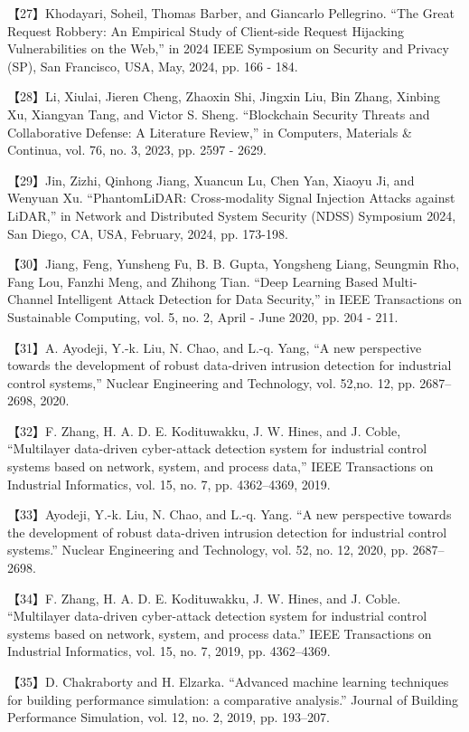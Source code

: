 【27】Khodayari, Soheil, Thomas Barber, and Giancarlo Pellegrino. “The Great Request Robbery: An Empirical Study of Client-side Request Hijacking Vulnerabilities on the Web,” in 2024 IEEE Symposium on Security and Privacy (SP), San Francisco, USA, May, 2024, pp. 166 - 184.

【28】Li, Xiulai, Jieren Cheng, Zhaoxin Shi, Jingxin Liu, Bin Zhang, Xinbing Xu, Xiangyan Tang, and Victor S. Sheng. “Blockchain Security Threats and Collaborative Defense: A Literature Review,” in Computers, Materials \& Continua, vol. 76, no. 3, 2023, pp. 2597 - 2629.

【29】Jin, Zizhi, Qinhong Jiang, Xuancun Lu, Chen Yan, Xiaoyu Ji, and Wenyuan Xu. “PhantomLiDAR: Cross-modality Signal Injection Attacks against LiDAR,” in Network and Distributed System Security (NDSS) Symposium 2024, San Diego, CA, USA, February, 2024, pp. 173-198.

【30】Jiang, Feng, Yunsheng Fu, B. B. Gupta, Yongsheng Liang, Seungmin Rho, Fang Lou, Fanzhi Meng, and Zhihong Tian. “Deep Learning Based Multi-Channel Intelligent Attack Detection for Data Security,” in IEEE Transactions on Sustainable Computing, vol. 5, no. 2, April - June 2020, pp. 204 - 211.

【31】A. Ayodeji, Y.-k. Liu, N. Chao, and L.-q. Yang, “A new perspective towards the development of robust data-driven intrusion detection for industrial control systems,” Nuclear Engineering and Technology, vol. 52,no. 12, pp. 2687–2698, 2020.

【32】F. Zhang, H. A. D. E. Kodituwakku, J. W. Hines, and J. Coble, “Multilayer data-driven cyber-attack detection system for industrial control systems based on network, system, and process data,” IEEE Transactions on Industrial Informatics, vol. 15, no. 7, pp. 4362–4369, 2019.

【33】Ayodeji, Y.-k. Liu, N. Chao, and L.-q. Yang. “A new perspective towards the development of robust data-driven intrusion detection for industrial control systems.” Nuclear Engineering and Technology, vol. 52, no. 12, 2020, pp. 2687–2698.

【34】F. Zhang, H. A. D. E. Kodituwakku, J. W. Hines, and J. Coble. “Multilayer data-driven cyber-attack detection system for industrial control systems based on network, system, and process data.” IEEE Transactions on Industrial Informatics, vol. 15, no. 7, 2019, pp. 4362–4369.

【35】D. Chakraborty and H. Elzarka. “Advanced machine learning techniques for building performance simulation: a comparative analysis.” Journal of Building Performance Simulation, vol. 12, no. 2, 2019, pp. 193–207.

